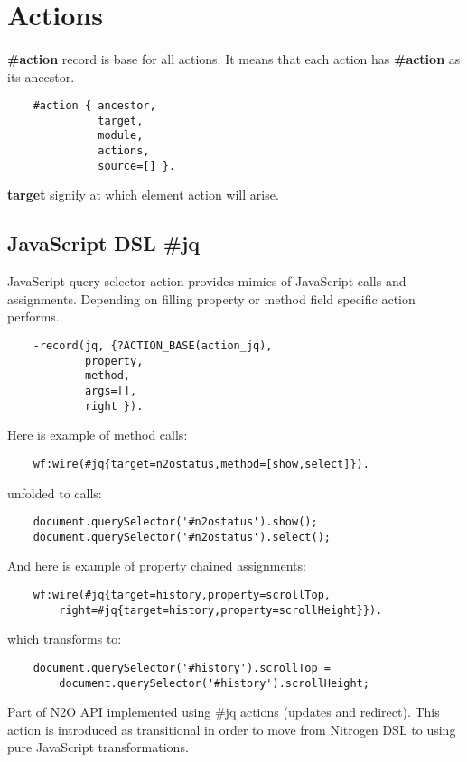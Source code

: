 \section{Actions}

\paragraph{}
{\bf \#action} record is base for all actions. It means that each action
has {\bf \#action} as its ancestor.

\vspace{1\baselineskip}
\begin{lstlisting}
    #action { ancestor,
              target,
              module,
              actions,
              source=[] }.
\end{lstlisting}
\vspace{1\baselineskip}

{\bf target} signify at which element action will arise.

\subsection{JavaScript DSL {\bf \#jq}}
JavaScript query selector action provides mimics of JavaScript calls and assignments.
Depending on filling property or method field specific action performs.

\vspace{1\baselineskip}
\begin{lstlisting}
    -record(jq, {?ACTION_BASE(action_jq),
            property,
            method,
            args=[],
            right }).
\end{lstlisting}
\vspace{1\baselineskip}

Here is example of method calls:
\begin{lstlisting}
    wf:wire(#jq{target=n2ostatus,method=[show,select]}).
\end{lstlisting}
unfolded to calls:
\begin{lstlisting}
    document.querySelector('#n2ostatus').show();
    document.querySelector('#n2ostatus').select();
\end{lstlisting}
\vspace{1\baselineskip}

And here is example of property chained assignments:
\begin{lstlisting}
    wf:wire(#jq{target=history,property=scrollTop,
        right=#jq{target=history,property=scrollHeight}}).
\end{lstlisting}
which transforms to:
\begin{lstlisting}
    document.querySelector('#history').scrollTop =
        document.querySelector('#history').scrollHeight;
\end{lstlisting}
\vspace{1\baselineskip}
Part of N2O API implemented using \#jq actions (updates and redirect).
This action is introduced as transitional in order to move
from Nitrogen DSL to using pure JavaScript transformations.

